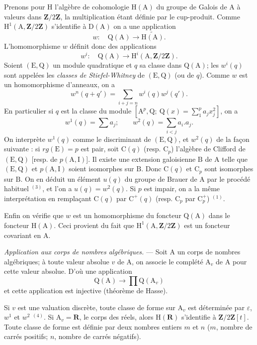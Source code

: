 Prenons pour $\mathrm H$ l'algèbre de cohomologie $\mathrm H(\mathrm A)$ du groupe de Galois
de $\mathrm A$ à valeurs dans $\mathbf Z/2\mathbf Z$, la multiplication étant définie par le
cup-produit. Comme $\mathrm H^1(\mathrm A,\mathbf Z/2\mathbf Z)$ s'identifie à
$\mathrm D(\mathrm A)$ on a une application
\[
w:\quad\mathrm Q(\mathrm A)\to\widetilde{\mathrm H(\mathrm A)}.
\]
L'homomorphisme $w$ définit donc des applications
\[
w^i:\quad\mathrm Q(\mathrm A)\to\mathrm H^i(\mathrm A,\mathbf Z/2\mathbf Z).
\]
Soient $(\mathrm E,\mathrm Q)$ un module quadratique et $q$ sa classe dans
$\mathrm Q(\mathrm A)$; les $w^i(q)$ sont appelées les \textit{classes de
Stiefel-Whitney} de $(\mathrm E,\mathrm Q)$ (ou de $q$).
Comme $w$ est un homomorphisme d'anneaux, on a
\[
w^n(q+q')=\sum_{i+j=n}w^i(q)w^j(q').
\]
En particulier si $q$ est la classe du module
$\left[\mathrm A^p,\mathrm Q;\ \mathrm Q(x)=\sum_1^p a_jx_j^2\right]$, on a
\[
w^1(q)=\sum a_j;\qquad w^2(q)=\sum_{i<j}a_i.a_j.
\]
On interprète $w^1(q)$ comme le discriminant de $(\mathrm E,\mathrm Q)$,
et $w^2(q)$ de la façon suivante : si $rg(\mathrm E)=p$ est pair,
soit $\mathrm C(q)$ (resp. $\mathrm C_p$) l'algèbre de Clifford de
$(\mathrm E,\mathrm Q)$ [resp. de $p(\mathrm A,\mathrm I)$].
Il existe une extension galoisienne $\mathrm B$ de $\mathrm A$ telle que
$(\mathrm E,\mathrm Q)$ et $p(\mathrm A,\mathrm I)$ soient isomorphes sur $\mathrm B$.
Donc $\mathrm C(q)$ et $\mathrm C_p$ sont isomorphes sur $\mathrm B$.
On en déduit un élément $u(q)$ du groupe de Brauer de $\mathrm A$ par le procédé
habituel $^{(3)}$, et l'on a $u(q)=w^2(q)$. Si $p$ est impair, on a la même
interprétation en remplaçant $\mathrm C(q)$ par $\mathrm C^+(q)$
(resp. $\mathrm C_p$ par $\mathrm C_p^+$) $^{(1)}$.

Enfin on vérifie que $w$ est un homomorphisme du foncteur $\mathrm Q(\mathrm A)$
dans le foncteur $\mathrm H(\mathrm A)$. Ceci provient du fait que
$\mathrm H^1(\mathrm A,\mathbf Z/2\mathbf Z)$ est un foncteur covariant en $\mathrm A$.

\textit{Application aux corps de nombres algébriques.} --- Soit $\mathrm A$ un corps de
nombres algébriques; à toute valeur absolue $v$ de $\mathrm A$, on associe le
complété $\mathrm A_v$ de $\mathrm A$ pour cette valeur absolue. D'où une application
\[
\mathrm Q(\mathrm A)\to\prod\mathrm Q(\mathrm A_v)
\]
et cette application est injective (théorème de Hasse).

Si $v$ est une valuation discrète, toute classe de forme sur $\mathrm A_v$
est déterminée par $\varepsilon$, $w^1$ et $w^2$ $^{(4)}$.
Si $\mathrm A_v=\mathbf R$, le corps des réels, alors $\mathrm H(\mathbf R)$
s'identifie à $\mathbf Z/2\mathbf Z[t]$. Toute classe de forme est définie par
deux nombres entiers $m$ et $n$ ($m$, nombre de carrés positifs; $n$, nombre de
carrés négatifs).

